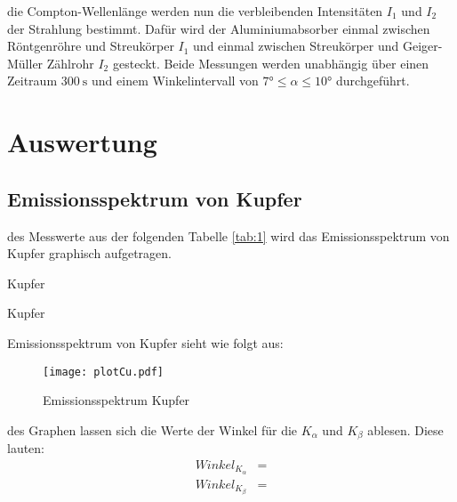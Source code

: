      \justifying die Compton-Wellenlänge werden nun die verbleibenden Intensitäten $I_1$ und $I_2$ der Strahlung bestimmt. Dafür wird der Aluminiumabsorber 
     einmal zwischen Röntgenröhre und Streukörper $I_1$ und einmal zwischen Streukörper und Geiger-Müller Zählrohr $I_2$ gesteckt. Beide Messungen werden unabhängig über einen 
     Zeitraum $\SI{300}{\second}$ und einem Winkelintervall von $7° \leq \alpha \leq 10°$ durchgeführt. 



\section{Auswertung}

    \subsection{Emissionsspektrum von Kupfer}

    \justifying des Messwerte aus der folgenden Tabelle \ref{tab:1} wird das Emissionsspektrum von Kupfer graphisch aufgetragen.

    \begin{table}[H]
        \centering
        
        \caption{Kupfer}
        \label{tab:1}
    \end{table}

    \begin{table}[H]
        \centering
        
        \caption{Kupfer}
        \label{tab:2}
    \end{table}

    \justifying Emissionsspektrum von Kupfer sieht wie folgt aus:

    \begin{figure}[H]
        \centering
        \texttt{[image: plotCu.pdf]}
        \caption{Emissionsspektrum Kupfer}
        \label{fig:2}
    \end{figure}

    \justifying des Graphen lassen sich die Werte der Winkel für die $K_{\alpha}$ und $K_{\beta}$ ablesen. Diese lauten:
    \begin{align}
        Winkel_{K_{\alpha}} &= \text{}  \label{eq:5}\\
        Winkel_{K_{\beta}}  &= \text{} \label{eq:6}
    \end{align}

